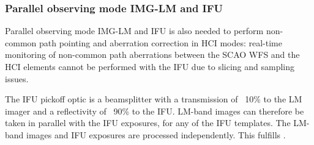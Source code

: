 \subsubsection{Parallel observing mode IMG-LM and IFU}\label{sssec:parallellmifu}
Parallel observing mode IMG-LM and IFU is also needed to perform non-common path pointing and aberration correction in \ac{HCI} modes:
real-time monitoring of non-common path aberrations between the \ac{SCAO} \ac{WFS} and the \ac{HCI} elements cannot be performed with the \ac{IFU} due to slicing and sampling issues.

The IFU pickoff optic is a beamsplitter with a transmission of ~10\% to the LM imager and a reflectivity of ~90\% to the IFU. %
LM-band images can therefore be taken in parallel with the IFU exposures, for any of the IFU templates.
The LM-band images and IFU exposures are processed independently.
This fulfills .

